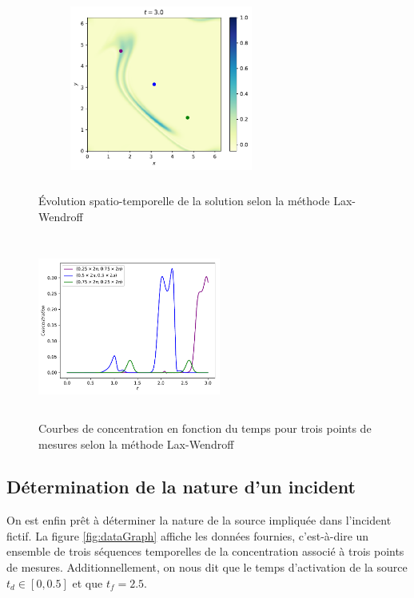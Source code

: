 \documentclass{article}
\begin{document}
\begin{figure}[H]
\begin{subfigure}{0.5\linewidth}
		\includegraphics[width=6cm, height=6cm]{img/LWDM3s.pdf}
		\centering
		\caption{}
		\label{fig:tau}
	\end{subfigure}
	\caption{Évolution spatio-temporelle de la solution selon la méthode Lax-Wendroff}
	\label{fig:LWDM}
\end{figure}

\begin{figure}[H]
	\includegraphics[width=6cm, height=6cm]{img/LWGraph.pdf}
	\centering
	\caption{Courbes de concentration en fonction du temps pour trois points de mesures selon la méthode Lax-Wendroff}
	\label{fig:LWGraph}
\end{figure}


\subsection{Détermination de la nature d'un incident}\label{sec:incident}

On est enfin prêt à déterminer la nature de la source impliquée dans l'incident fictif. La figure \ref{fig:dataGraph} affiche les données fournies, c'est-à-dire un ensemble de trois séquences temporelles de la concentration associé à trois points de mesures. Additionnellement, on nous dit que le temps d'activation de la source $t_d \in [0, 0.5]$ et que $t_f = 2.5$. 
\end{document}
